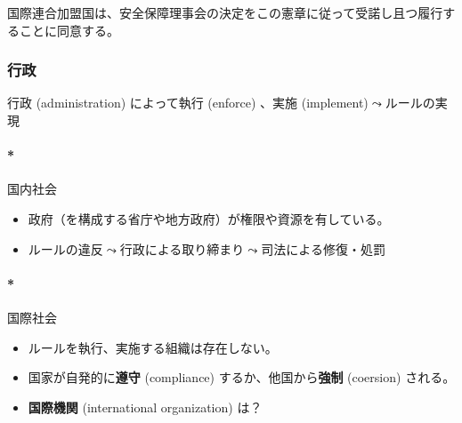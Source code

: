 \documentclass[
  xelatex,
  ja=standard]{bxjsarticle}
\let\oldparagraph\paragraph
\renewcommand{\paragraph}[1]{\oldparagraph{#1}\mbox{}}
\providecommand{\tightlist}{%
  \setlength{\itemsep}{0pt}\setlength{\parskip}{0pt}}\usepackage{longtable,booktabs,array}
\begin{document}
\begin{tcolorbox}[enhanced jigsaw, leftrule=.75mm, bottomrule=.15mm, left=2mm, toprule=.15mm, breakable, colbacktitle=quarto-callout-note-color!10!white, opacitybacktitle=0.6, bottomtitle=1mm, toptitle=1mm, colback=white, titlerule=0mm, arc=.35mm, title=\textcolor{quarto-callout-note-color}{\faInfo}\hspace{0.5em}{\href{https://www.unic.or.jp/info/un/charter/text_japanese/}{国連憲章}　第25条}, opacityback=0, colframe=quarto-callout-note-color-frame, coltitle=black, rightrule=.15mm]

国際連合加盟国は、安全保障理事会の決定をこの憲章に従って受諾し且つ履行することに同意する。

\end{tcolorbox}

\hypertarget{ux884cux653f}{%
\subsubsection{行政}\label{ux884cux653f}}

行政 (administration) によって執行 (enforce) 、実施
(implement)\(\leadsto\)ルールの実現

\hypertarget{ux56fdux5185ux793eux4f1a-1}{%
\paragraph*{国内社会}\label{ux56fdux5185ux793eux4f1a-1}}

\begin{itemize}
\tightlist
\item
  政府（を構成する省庁や地方政府）が権限や資源を有している。
\item
  ルールの違反\(\leadsto\)行政による取り締まり\(\leadsto\)司法による修復・処罰
\end{itemize}

\hypertarget{ux56fdux969bux793eux4f1a-1}{%
\paragraph*{国際社会}\label{ux56fdux969bux793eux4f1a-1}}

\begin{itemize}
\tightlist
\item
  ルールを執行、実施する組織は存在しない。
\item
  国家が自発的に\textbf{遵守} (compliance) するか、他国から\textbf{強制}
  (coersion) される。
\item
  \textbf{国際機関} (international organization) は？
\end{itemize}
\end{document}
